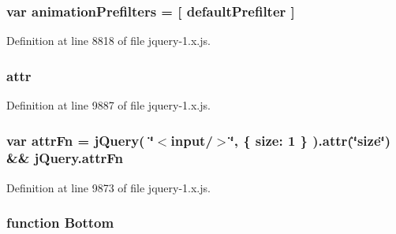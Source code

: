 \subsubsection[{\texorpdfstring{animation\+Prefilters}{animationPrefilters}}]{\setlength{\rightskip}{0pt plus 5cm}var animation\+Prefilters = \mbox{[} {\bf default\+Prefilter} \mbox{]}}\hypertarget{jquery-1_8x_8js_adb3f17c5359fbc12b7043b6969553d78}{}\label{jquery-1_8x_8js_adb3f17c5359fbc12b7043b6969553d78}


Definition at line 8818 of file jquery-\/1.\+x.\+js.

\subsubsection[{\texorpdfstring{attr}{attr}}]{ attr}\hypertarget{jquery-1_8x_8js_af22ff3acc1911f7b1d56fd19d45db91e}{}\label{jquery-1_8x_8js_af22ff3acc1911f7b1d56fd19d45db91e}


Definition at line 9887 of file jquery-\/1.\+x.\+js.

\subsubsection[{\texorpdfstring{attr\+Fn}{attrFn}}]{\setlength{\rightskip}{0pt plus 5cm}var attr\+Fn = {\bf j\+Query}( \char`\"{}$<$input/$>$\char`\"{}, \{ size\+: 1 \} ).{\bf attr}(\char`\"{}size\char`\"{}) \&\& j\+Query.\+attr\+Fn}\hypertarget{jquery-1_8x_8js_a5cf81c995a7795aa7a0249b39e60b053}{}\label{jquery-1_8x_8js_a5cf81c995a7795aa7a0249b39e60b053}


Definition at line 9873 of file jquery-\/1.\+x.\+js.

\subsubsection[{\texorpdfstring{Bottom}{Bottom}}]{\setlength{\rightskip}{0pt plus 5cm}function Bottom}\hypertarget{jquery-1_8x_8js_aff76c1cba4a00c678dfce0e0c5a5538a}{}\label{jquery-1_8x_8js_aff76c1cba4a00c678dfce0e0c5a5538a}


